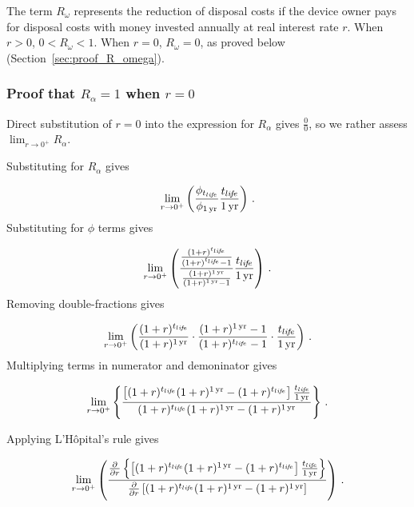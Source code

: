 The term $R_\omega$ represents the reduction of disposal costs 
if the device owner pays for disposal costs with money
invested annually at real interest rate $r$. 
When $r > 0$, $0 < R_\omega < 1$.
When $r = 0$, $R_\omega = 0$, as proved below
(Section~\ref{sec:proof_R_omega}).


\subsubsection{Proof that $R_\alpha = 1$ when $r = 0$}
\label{sec:proof_R_alpha}

Direct substitution of $r = 0$ into the expression
for $R_\alpha$ gives $\frac{0}{0}$, 
so we rather assess
$\lim_{r \to 0^+} R_\alpha$.

Substituting for $R_\alpha$ gives

\begin{equation}
  \lim_{r \to 0^+} \left( \frac{\phi_{t_{li\!f\!e}}}{\phi_{1\,\mathrm{yr}}} \frac{t_{li\!f\!e}}{1\,\mathrm{yr}} \right) \, .
\end{equation}
%
Substituting for $\phi$ terms gives

\begin{equation}
  \lim_{r \to 0^+} \left( \frac{\frac{(1 + r)^{t_{li\!f\!e}}}{(1 + r)^{t_{li\!f\!e}} - 1}}{\frac{(1 + r)^{1\,\mathrm{yr}}}{(1 + r)^{1\,\mathrm{yr}} - 1}} \frac{t_{li\!f\!e}}{1\,\mathrm{yr}} \right) \, .
\end{equation}
%
Removing double-fractions gives

\begin{equation}
  \lim_{r \to 0^+} \left(
  \frac{(1 + r)^{t_{li\!f\!e}}}{(1 + r)^{1\,\mathrm{yr}}} \cdot
  \frac{(1 + r)^{1\,\mathrm{yr}} - 1}{(1 + r)^{t_{li\!f\!e}} - 1} \cdot
  \frac{t_{li\!f\!e}}{1\,\mathrm{yr}}
  \right) \, .
\end{equation}
%
Multiplying terms in numerator and demoninator gives

\begin{equation}
  \lim_{r \to 0^+} \left\{
  \frac{\left[(1 + r)^{\tlife} (1 + r)^{\oneyr} - (1 + r)^{\tlife} \right] \frac{\tlife}{\oneyr}}{(1 + r)^{\tlife} (1 + r)^{\oneyr} - (1 + r)^{\oneyr}}
  \right\} \, .
\end{equation}

Applying L'H\^{o}pital's rule gives

\begin{equation}
  \lim_{r \to 0^+} \left(
  \frac{\frac{\partial}{\partial r} \left\{ \left[(1 + r)^{\tlife} (1 + r)^{\oneyr} - (1 + r)^{\tlife} \right] \frac{\tlife}{\oneyr} \right\}}
  {\frac{\partial}{\partial r} \left[ (1 + r)^{\tlife} (1 + r)^{\oneyr} - (1 + r)^{\oneyr}\right]}
  \right) \, .
\end{equation}

